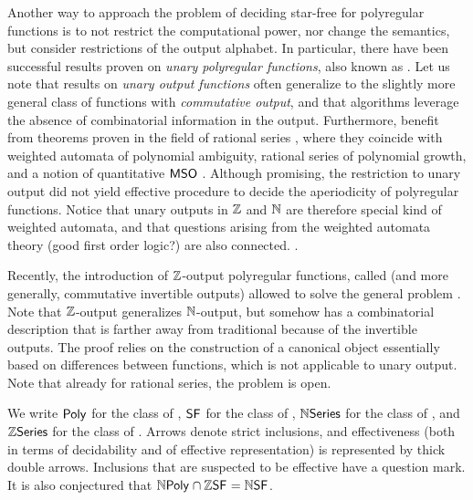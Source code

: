 Another way to approach the problem of deciding star-free for polyregular
functions is to not restrict the computational power, nor change the semantics,
but consider restrictions of the output alphabet. In particular, there have
been successful results proven on \emph{unary polyregular functions}, also
known as 
\cite{doueneau2021pebble,doueneau2022hiding}. Let us note that results on
\emph{unary output functions} often generalize to the slightly more general
class of functions with \emph{commutative output}, and that algorithms leverage
the absence of combinatorial information in the output. Furthermore,
 benefit from theorems proven in the field of
rational series \cite{berstel2011noncommutative}, where they coincide with
weighted automata of polynomial ambiguity, rational series of polynomial
growth, and a notion of quantitative $\mathsf{MSO}$
\cite{berstel2011noncommutative,kreutzer2013,schutzenberger1962}. Although
promising, the restriction to unary output did not yield effective procedure to
decide the aperiodicity of polyregular functions.
Notice that unary outputs in $\mathbb{Z}$ and $\mathbb{N}$
are therefore special kind of weighted automata,
and that questions arising from the weighted automata
theory (good first order logic?) are also connected.
\cite{droste2019aperiodic,reutenauer_series_1980}.

Recently, the introduction of $\mathbb{Z}$-output polyregular functions, called
 (and more generally, commutative invertible
outputs) allowed to solve the general problem \cite{LOPEZ23b}. Note that
$\mathbb{Z}$-output generalizes $\mathbb{N}$-output, but somehow has a combinatorial
description that is farther away from traditional 
because of the invertible outputs. The proof relies on the construction of a
canonical object essentially based on differences between functions, which is
not applicable to unary output. Note that already for rational series, the
problem is open.


We write $\Poly$ for the class of ,
$\SF$ for the class of ,
$\mathbb{N}\mathsf{Series}$ for the class of ,
and $\mathbb{Z}\mathsf{Series}$ for the class of .
Arrows denote strict inclusions, and effectiveness
(both in terms of decidability and of effective representation)
is represented by thick double arrows.
Inclusions that are suspected to be effective have a question mark.
It is also conjectured that $\NPoly \cap \ZSF = \NSF$.

